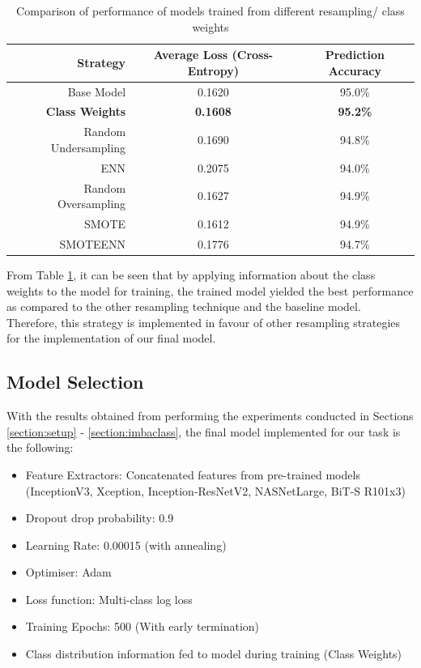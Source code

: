 \documentclass[sigconf,nonacm=true]{acmart}
\begin{document}
\begin{table}[H]
	\begin{adjustbox}{width=\columnwidth}
	\begin{tabular}{rcc}
		\toprule
		Strategy&Average Loss (Cross-Entropy)&Prediction Accuracy\\
		\midrule
		Base Model & 0.1620 & 95.0\%\\
		\textbf{Class Weights} & \textbf{0.1608} & \textbf{95.2\%}\\
		Random Undersampling & 0.1690 & 94.8\%\\
		ENN & 0.2075 & 94.0\%\\
		Random Oversampling & 0.1627 & 94.9\%\\
		SMOTE & 0.1612 & 94.9\%\\
		SMOTEENN & 0.1776 & 94.7\%\\
		\bottomrule
	\end{tabular}
	\end{adjustbox}
	\caption{Comparison of performance of models trained from different resampling/ class weights}
	\label{tab:sampperf}
\end{table}
From Table \ref{tab:sampperf}, it can be seen that by applying information about the class weights 
to the model for training, the trained model yielded the best performance as compared to the other 
resampling technique and the baseline model. Therefore, this strategy is implemented in favour of other 
resampling strategies for the implementation of our final model.

\subsection{Model Selection}
\label{section:modelselection}
With the results obtained from performing the experiments conducted in Sections \ref{section:setup} - 
\ref{section:imbaclass}, the final model implemented for our task is the following:\\

\begin{itemize}
	\item Feature Extractors: Concatenated features from pre-trained models (InceptionV3, Xception, Inception-ResNetV2, NASNetLarge, BiT-S R101x3)
	\item Dropout drop probability: 0.9
	\item Learning Rate: 0.00015 (with annealing)
	\item Optimiser: Adam
	\item Loss function: Multi-class log loss
	\item Training Epochs: 500 (With early termination)
	\item Class distribution information fed to model during training (Class Weights)
\end{itemize}
\end{document}
